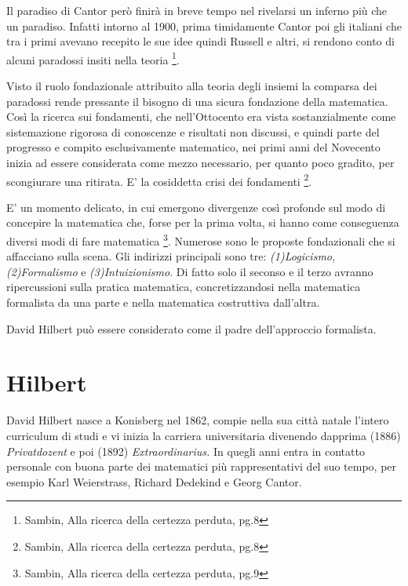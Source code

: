 Il paradiso di Cantor però finirà in breve tempo nel rivelarsi un
inferno più che un paradiso. Infatti intorno al 1900, prima timidamente
Cantor poi gli italiani che tra i primi avevano recepito le sue idee
quindi Russell e altri, si rendono conto di alcuni paradossi insiti
nella teoria%
\footnote{Sambin, Alla ricerca della certezza perduta, pg.8%
}. 

Visto il ruolo fondazionale attribuito alla teoria degli insiemi la
comparsa dei paradossi rende pressante il bisogno di una sicura fondazione
della matematica. Così la ricerca sui fondamenti, che nell'Ottocento
era vista sostanzialmente come sistemazione rigorosa di conoscenze
e risultati non discussi, e quindi parte del progresso e compito esclusivamente
matematico, nei primi anni del Novecento inizia ad essere considerata
come mezzo necessario, per quanto poco gradito, per scongiurare una
ritirata. E' la cosiddetta crisi dei fondamenti%
\footnote{Sambin, Alla ricerca della certezza perduta, pg.8%
}.

E' un momento delicato, in cui emergono divergenze così profonde sul
modo di concepire la matematica che, forse per la prima volta, si
hanno come conseguenza diversi modi di fare matematica%
\footnote{Sambin, Alla ricerca della certezza perduta, pg.9%
}. Numerose sono le proposte fondazionali che si affacciano sulla scena.
Gli indirizzi principali sono tre: \emph{(1)Logicismo}, \emph{(2)Formalismo}
e \emph{(3)Intuizionismo}. Di fatto solo il seconso e il terzo avranno
ripercussioni sulla pratica matematica, concretizzandosi nella matematica
formalista da una parte e nella matematica costruttiva dall'altra.

David Hilbert può essere considerato come il padre dell'approccio
formalista.


\section{Hilbert}

David Hilbert nasce a Konisberg nel 1862, compie nella sua città natale
l'intero curriculum di studi e vi inizia la carriera universitaria
divenendo dapprima (1886) \emph{Privatdozent }e poi (1892) \emph{Extraordinarius.}
In quegli anni entra in contatto personale con buona parte dei matematici
più rappresentativi del suo tempo, per esempio Karl Weierstrass, Richard
Dedekind e Georg Cantor.

